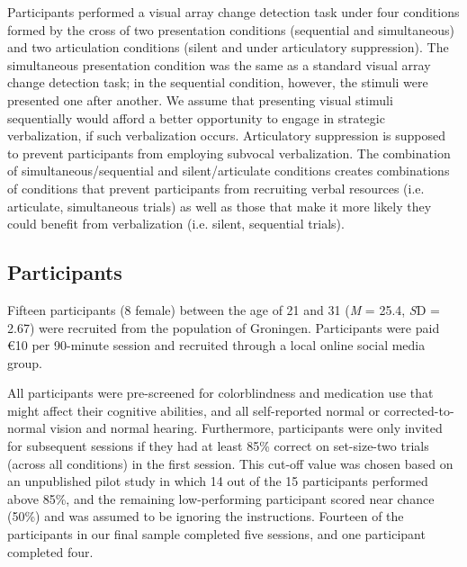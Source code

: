 

Participants performed a visual array change detection task under four conditions formed by the cross of two presentation conditions (sequential and simultaneous) and two articulation conditions (silent and under articulatory suppression). The simultaneous presentation condition was the same as a standard visual array change detection task; in the sequential condition, however, the stimuli were presented one after another. We assume that presenting visual stimuli sequentially would afford a better opportunity to engage in strategic verbalization, if such verbalization occurs. Articulatory suppression is supposed to prevent participants from employing subvocal verbalization. The combination of simultaneous/sequential and silent/articulate conditions creates combinations of conditions that prevent participants from recruiting verbal resources (i.e. articulate, simultaneous trials) as well as those that make it more likely they could benefit from verbalization (i.e. silent, sequential trials). 


\subsection{Participants} %
Fifteen participants (8 female) between the age of 21 and 31 ({\emph M} = 25.4, {\emph SD} = 2.67) were recruited from the population of Groningen. Participants were paid \euro10 per 90-minute session and recruited through a local online social media group.

All participants were pre-screened for colorblindness and medication use that might affect their cognitive abilities, and all self-reported normal or corrected-to-normal vision and normal hearing. Furthermore, participants were only invited for subsequent sessions if they had at least 85\% correct on set-size-two trials (across all conditions) in the first session. This cut-off value was chosen based on an unpublished pilot study in which 14 out of the 15 participants performed above 85\%, and the remaining low-performing participant scored near chance (50\%) and was assumed to be ignoring the instructions. Fourteen of the participants in our final sample completed five sessions, and one participant completed four. 


